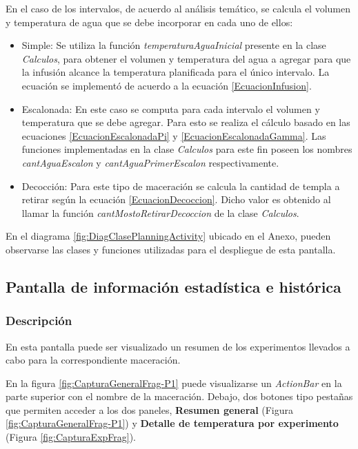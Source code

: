             \par En el caso de los intervalos, de acuerdo al análisis temático, se calcula el volumen y temperatura de agua que se debe incorporar en cada uno de ellos:
            \begin{itemize}
                \item Simple: Se utiliza la función \textit{temperaturaAguaInicial} presente en la clase \textit{Calculos}, para obtener el volumen y temperatura del agua a agregar para que la infusión alcance la temperatura planificada para el único intervalo. La ecuación se implementó de acuerdo a la ecuación \ref{EcuacionInfusion}.
                
                \item Escalonada: En este caso se computa para cada intervalo el volumen y temperatura que se debe agregar. Para esto se realiza el cálculo basado en las ecuaciones \ref{EcuacionEscalonadaPi} y \ref{EcuacionEscalonadaGamma}. Las funciones implementadas en la clase \textit{Calculos} para este fin poseen los nombres \textit{cantAguaEscalon} y \textit{cantAguaPrimerEscalon} respectivamente.
                
                \item Decocción: Para este tipo de maceración se calcula la cantidad de templa a retirar según la ecuación \ref{EcuacionDecoccion}. Dicho valor es obtenido al llamar la función \textit{cantMostoRetirarDecoccion} de la clase \textit{Calculos}.
            \end{itemize}
            
            \par En el diagrama \ref{fig:DiagClasePlanningActivity} ubicado en el Anexo, pueden observarse las clases y funciones utilizadas para el despliegue de esta pantalla.
            
        \subsection{Pantalla de información estadística e histórica}
        \label{DescripPantallaEstadística}
            \subsubsection{Descripción}
            \par En esta pantalla puede ser visualizado un resumen de los experimentos llevados a cabo para la correspondiente maceración.
            \par En la figura \ref{fig:CapturaGeneralFrag-P1} puede visualizarse un \textit{ActionBar} en la parte superior con el nombre de la maceración. Debajo, dos botones tipo pestañas que permiten acceder a los dos paneles,  \textbf{Resumen general} (Figura \ref{fig:CapturaGeneralFrag-P1}) y \textbf{Detalle de temperatura por experimento} (Figura \ref{fig:CapturaExpFrag}). 
            
